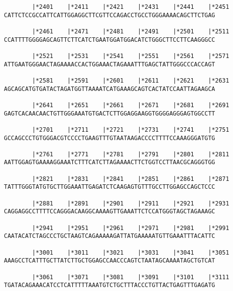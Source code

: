 \documentclass{article}
\begin{document}
\begin{Verbatim}
        |*2401    |*2411    |*2421    |*2431    |*2441    |*2451
CATTCTCCGCCATTCATTGGAGGCTTCGTTCCAGACCTGCCTGGGAAAACAGCTTCTGAG
                                                            
        |*2461    |*2471    |*2481    |*2491    |*2501    |*2511
CCATTTTGGGGAGCAGTTCTTCATCTGAATGGATGGACATCTGGGCTTCCTTCAAGGGCC
                                                            
        |*2521    |*2531    |*2541    |*2551    |*2561    |*2571
ATTGAATGGGAACTAGAAAACCACTGGAAACTAGAAATTTGAGCTATTGGGCCCACCAGT
                                                            
        |*2581    |*2591    |*2601    |*2611    |*2621    |*2631
AGCAGCATGTGATACTAGATGGTTAAAATCATGAAAGCAGTCACTATCCAATTAGAAGCA
                                                            
        |*2641    |*2651    |*2661    |*2671    |*2681    |*2691
GAGTCACAACAACTGTTGGGAAATGTGACTCTTGGAGGAAGGTGGGGAGGGAGTGGCCTT
                                                            
        |*2701    |*2711    |*2721    |*2731    |*2741    |*2751
GCCAGCCCTGTGGGACGTCCCCTGAAGTTTGTAATAAGACCCCTTTTCCAAAGGGATGTG
                                                            
        |*2761    |*2771    |*2781    |*2791    |*2801    |*2811
AATTGGAGTGAAAAGGAAATCTTTCATCTTAGAAAACTTCTGGTCCTTAACGCAGGGTGG
                                                            
        |*2821    |*2831    |*2841    |*2851    |*2861    |*2871
TATTTGGGTATGTGCTTGGAAATTGAGATCTCAAGAGTGTTTGCCTTGGAGCCAGCTCCC
                                                            
        |*2881    |*2891    |*2901    |*2911    |*2921    |*2931
CAGGAGGCCTTTTCCAGGGACAAGGCAAAAGTTGAAATTCTCCATGGGTAGCTAGAAAGC
                                                            
        |*2941    |*2951    |*2961    |*2971    |*2981    |*2991
CAATACATCTAGCCCTGCTAAGTCAGAAAAAGATTATGAAAAATGTTGAAATTTACATTC
                                                            
        |*3001    |*3011    |*3021    |*3031    |*3041    |*3051
AAAGCCTCATTTGCTTATCTTGCTGGAGCCAACCCAGTCTAATAGCAAAATAGCTGTCAT
                                                            
        |*3061    |*3071    |*3081    |*3091    |*3101    |*3111
TGATACAGAAACATCCTCATTTTTAAATGTCTGCTTTACCCTGTTACTGAGTTTGAGATG
                                                            

\end{Verbatim}
\end{document}
